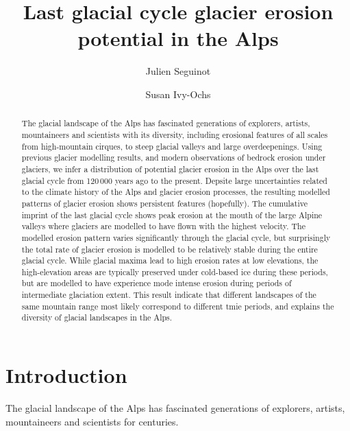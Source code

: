 \documentclass[utf8]{article}
\title{Last glacial cycle glacier erosion potential in the Alps}
\author[1]{Julien Seguinot}
\author[2]{Susan Ivy-Ochs}
\affil[1]{Laboratory of Hydraulics, Hydrology and Glaciology,
          ETH Zürich, Switzerland}
\affil[2]{Laboratory of Ion Beam Physics, ETH Zürich, Switzerland}
\begin{document}

\maketitle

\begin{abstract}

    The glacial landscape of the Alps has fascinated generations of explorers,
    artists, mountaineers and scientists with its diversity, including
    erosional features of all scales from high-mountain cirques, to steep
    glacial valleys and large overdeepenings. Using previous glacier modelling
    results, and modern observations of bedrock erosion under glaciers, we
    infer a distribution of potential glacier erosion in the Alps over the last
    glacial cycle from 120\,000 years ago to the present.
    Depsite large uncertainties related to the climate history of the Alps and
    glacier erosion processes, the resulting modelled patterns of glacier
    erosion shows persistent features (hopefully). The cumulative imprint of
    the last glacial cycle shows peak erosion at the mouth of the large Alpine
    valleys where glaciers are modelled to have flown with the highest
    velocity. The modelled erosion pattern varies significantly through the
    glacial cycle, but surprisingly the total rate of glacier erosion is
    modelled to be relatively stable during the entire glacial cycle.  While
    glacial maxima lead to high erosion rates at low elevations, the
    high-elevation areas are typically preserved under cold-based ice during
    these periods, but are modelled to have experience mode intense erosion
    during periods of intermediate glaciation extent.
    This result indicate that different landscapes of the same mountain range
    most likely correspond to different tmie periods, and explains the
    diversity of glacial landscapes in the Alps.

\end{abstract}

\section{Introduction}

    The glacial landscape of the Alps has fascinated generations of explorers,
    artists, mountaineers and scientists for centuries.
\end{document}
